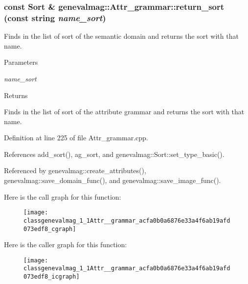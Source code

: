 \hypertarget{classgenevalmag_1_1Attr__grammar_acfa0b0a6876e33a4f6ab19afd073edf8}{
\subsubsection[{return\_\-sort}]{\setlength{\rightskip}{0pt plus 5cm}const {\bf Sort} \& genevalmag::Attr\_\-grammar::return\_\-sort (const string {\em name\_\-sort})}}
\label{classgenevalmag_1_1Attr__grammar_acfa0b0a6876e33a4f6ab19afd073edf8}
Finds in the list of sort of the semantic domain and returns the sort with that name. 
\begin{DoxyParams}{Parameters}
\item[{\em name\_\-sort}]\end{DoxyParams}
\begin{DoxyReturn}{Returns}

\end{DoxyReturn}
Finds in the list of sort of the attribute grammar and returns the sort with that name. 

Definition at line 225 of file Attr\_\-grammar.cpp.



References add\_\-sort(), ag\_\-sort, and genevalmag::Sort::set\_\-type\_\-basic().



Referenced by genevalmag::create\_\-attributes(), genevalmag::save\_\-domain\_\-func(), and genevalmag::save\_\-image\_\-func().



Here is the call graph for this function:\nopagebreak
\begin{figure}[H]
\begin{center}
\leavevmode
\texttt{[image: classgenevalmag\_1\_1Attr\_\_grammar\_acfa0b0a6876e33a4f6ab19afd073edf8\_cgraph]}
\end{center}
\end{figure}




Here is the caller graph for this function:\nopagebreak
\begin{figure}[H]
\begin{center}
\leavevmode
\texttt{[image: classgenevalmag\_1\_1Attr\_\_grammar\_acfa0b0a6876e33a4f6ab19afd073edf8\_icgraph]}
\end{center}
\end{figure}


